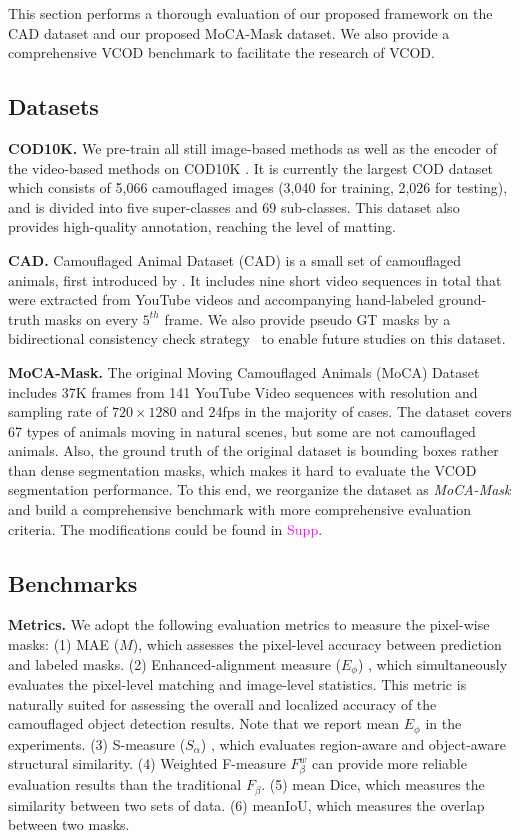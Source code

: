 \documentclass[10pt,twocolumn,letterpaper]{article}
\newcommand{\supp}[1]{\textcolor{magenta}{#1}}
\begin{document}
This section performs a thorough evaluation of our proposed framework on the CAD dataset and our proposed MoCA-Mask dataset. We also provide a comprehensive VCOD benchmark to facilitate the research of VCOD.

\subsection{Datasets}
\vspace{-5pt}
\textbf{COD10K.} We pre-train all still image-based methods as well as the encoder of the video-based methods on COD10K \cite{fan2021concealed}. It is currently the largest COD dataset which consists of 5,066 camouflaged images (3,040 for training, 2,026 for testing), and is divided into five super-classes and 69 sub-classes. This dataset also provides high-quality annotation, reaching the level of matting. 

\textbf{CAD.} Camouflaged Animal Dataset (CAD) is a small set of camouflaged animals, first introduced by \cite{bideau2016s}. It includes nine short video sequences in total that were extracted from YouTube videos and accompanying hand-labeled ground-truth masks on every $5^{th}$ frame. We also provide pseudo GT masks by a bidirectional consistency check strategy~\cite{teed2020raft} 
to enable future studies on this dataset.



\textbf{MoCA-Mask.}
The original Moving Camouflaged Animals (MoCA) Dataset \cite{lamdouar2020betrayed} includes 37K frames from 141 YouTube Video sequences with resolution and sampling rate of $720 \times 1280$ and 24fps in the majority of cases. The dataset covers 67 types of animals moving in natural scenes, but some are not camouflaged animals. Also, the ground truth of the original dataset is bounding boxes rather than dense segmentation masks, which makes it hard to evaluate the VCOD segmentation performance. To this end, we reorganize the dataset as \textit{MoCA-Mask} and build a comprehensive benchmark with more comprehensive evaluation criteria. 
The modifications could be found in \supp{Supp}.




\subsection{Benchmarks}
\textbf{Metrics.}  
We adopt the following evaluation metrics to measure the pixel-wise masks: (1) MAE ($M$), which assesses the pixel-level accuracy between prediction and labeled masks. (2) Enhanced-alignment measure ($E_\phi$) \cite{Fan2018Enhanced}, which simultaneously evaluates the pixel-level matching and image-level statistics. This metric is naturally suited for assessing the overall and localized accuracy of the camouflaged object detection results. Note that we report mean $E_\phi$ in the experiments. (3) S-measure ($S_\alpha$) \cite{fan2017structure}, which evaluates region-aware and object-aware structural similarity. (4) Weighted F-measure $F_\beta^w$ \cite{margolin2014evaluate} can provide more reliable evaluation results than the traditional $F_\beta$. (5) mean Dice, which measures the similarity between two sets of data. (6) meanIoU, which measures the overlap between two masks.
\end{document}
